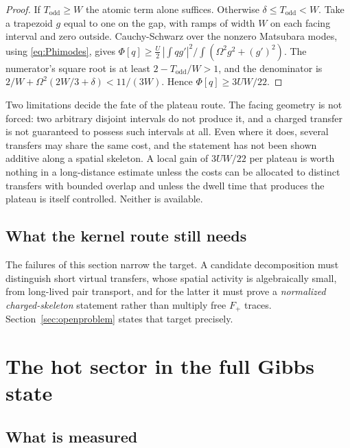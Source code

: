 \documentclass[11pt]{article}
\theoremstyle{definition}
\theoremstyle{remark}
\begin{document}
\begin{proof}
If $T_{\mathrm{odd}}\ge W$ the atomic term alone suffices. Otherwise
$\delta\le T_{\mathrm{odd}}<W$. Take a trapezoid $g$ equal to one on the gap, with
ramps of width $W$ on each facing interval and zero outside. Cauchy-Schwarz over
the nonzero Matsubara modes, using \eqref{eq:Phimodes}, gives
$\Phi[q]\ge\tfrac U2\,|\!\int qg'|^{2}/\int(\Omega^{2}g^{2}+(g')^{2})$. The
numerator's square root is at least $2-T_{\mathrm{odd}}/W>1$, and the denominator is
$2/W+\Omega^{2}(2W/3+\delta)<11/(3W)$. Hence $\Phi[q]\ge3UW/22$.
\end{proof}

Two limitations decide the fate of the plateau route. The facing geometry is not
forced: two arbitrary disjoint intervals do not produce it, and a charged
transfer is not guaranteed to possess such intervals at all. Even where it does,
several transfers may share the same cost, and the statement has not been shown
additive along a spatial skeleton. A local gain of $3UW/22$ per plateau is worth
nothing in a long-distance estimate unless the costs can be allocated to distinct
transfers with bounded overlap and unless the dwell time that produces the
plateau is itself controlled. Neither is available.

\subsection{What the kernel route still needs}

The failures of this section narrow the target. A candidate decomposition must
distinguish short virtual transfers, whose spatial activity is algebraically
small, from long-lived pair transport, and for the latter it must prove a
\emph{normalized charged-skeleton} statement rather than multiply free $F_{+}$
traces. Section~\ref{sec:openproblem} states that target precisely.

\section{The hot sector in the full Gibbs state}
\label{sec:vtail}

\subsection{What is measured}
\end{document}
